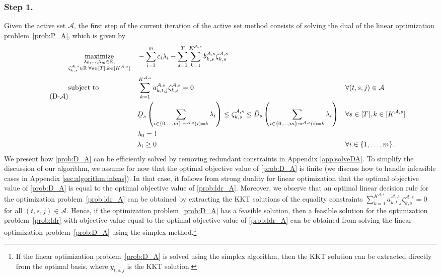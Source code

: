 \documentclass[nonblindrev,mnsc]{informs3} %
\def\Real{\mathbb{R}}
\let\R\Real
\newcommand{\ubar}[1]{\text{\b{$#1$}}}
\begin{document}
\subsubsection*{Step 1.} Given the active set $\mathcal{A}$, the first step of the current iteration of the active set method consists of solving the dual of the linear optimization problem~\eqref{prob:P_A}, which is given by
{\small
\begin{equation}  \label{prob:D_A} \tag{D-$\mathcal{A}$}
\begin{aligned}
&\underset{ \substack{
\lambda_0,\ldots,\lambda_m \in \R, \\
\zeta^{\mathcal{A},s}_{k,s} \in \R \; \forall s \in [T], k \in [K^{\mathcal{A},s}]}}{\textnormal{maximize}}&& - \sum_{i=1}^m c_i \lambda_i -  \sum_{s=1}^T  \sum_{k=1}^{K^{\mathcal{A},s}} b^{\mathcal{A},s}_{k,s} \zeta^{\mathcal{A},s}_{k,s}  \\
&\textnormal{subject to}&& \begin{aligned}[t]
&\sum_{k=1}^{K^{\mathcal{A},s}}  a^{\mathcal{A},s}_{k,t,j}  \zeta^{\mathcal{A},s}_{k,s}   = 0 && \forall (t,s,j) \in \mathcal{A} \\
&  \ubar{D}_s \left( \sum_{i \in \{0,\ldots,m\}: \pi^{\mathcal{A},s}(i) = k} \lambda_{i} \right)   \le \zeta^{\mathcal{A},s}_{k,s}  \le \bar{D}_s \left( \sum_{i \in \{0,\ldots,m\}: \pi^{\mathcal{A},s}(i) = k} \lambda_{i} \right)  && \forall  s \in [T], k \in [ K^{\mathcal{A},s}]\\
& \lambda_0 = 1 \\
&\lambda_i \ge 0 && \forall i \in \{1,\ldots,m\}. 
\end{aligned}
\end{aligned} 
\end{equation}
}%
We present how \eqref{prob:D_A} can be efficiently solved by removing redundant constraints in Appendix \ref{app:solveDA}. 
To simplify the discussion of our algorithm, we assume for now that the optimal objective value of \eqref{prob:D_A} is finite (we discuss how to handle infeasible cases in Appendix \ref{sec:algorithm:infeas}). In that case, it follows from strong duality for linear optimization  that the optimal objective value of \eqref{prob:D_A} is equal to the optimal objective value of \eqref{prob:ldr_A}. Moreover, we observe that an optimal linear decision rule for the optimization problem~\eqref{prob:ldr_A} can be obtained by extracting the KKT solutions of the equality constraints $\sum_{k=1}^{K^{\mathcal{A},s}}  a^{\mathcal{A},s}_{k,t,j}  \zeta^{\mathcal{A},s}_{k,s}   = 0$ for all $(t,s,j) \in \mathcal{A}$. Hence,  if the optimization problem~\eqref{prob:D_A} has a feasible solution, then a feasible solution for the optimization problem~\eqref{prob:ldr} with objective value equal to the optimal objective value of \eqref{prob:ldr_A} can be obtained from solving the linear optimization problem~\eqref{prob:D_A} using the simplex method.\footnote{If the linear optimization problem~\eqref{prob:D_A} is solved using the simplex algorithm, then the KKT solution can be extracted directly from the optimal basis, where $y_{t,s,j}$ is the KKT solution.  } 
\end{document}

